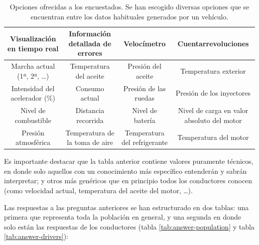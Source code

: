 \begin{table}[H]
  \centering
  \begin{tabularx}{\textwidth}{| C{.25} | C{.25} | C{.25}| C{.25} |}
    \hline
    Visualización en tiempo real   & Información detallada de errores & Velocímetro                  & Cuentarrevoluciones                        \\
    \hline
    Marcha actual (1ª, 2ª, \dots)  & Temperatura del aceite           & Presión del aceite           & Temperatura exterior                       \\
    \hline
    Intensidad del acelerador (\%) & Consumo actual                   & Presión de las ruedas        & Presión de los inyectores                  \\
    \hline
    Nivel de combustible           & Distancia recorrida              & Nivel de batería             & Nivel de carga en valor absoluto del motor \\
    \hline
    Presión atmosférica            & Temperatura de la toma de aire   & Temperatura del refrigerante & Temperatura del motor                      \\
    \hline
  \end{tabularx}
  \caption{Opciones ofrecidas a los encuestados. Se han escogido diversas opciones que se encuentran entre los datos habituales generados por un vehículo.}
  \label{tab:quest-options}
\end{table}

Es importante destacar que la tabla anterior contiene valores puramente técnicos,
en donde solo aquellos con un conocimiento más específico entenderán y sabrán
interpretar; y otros más genéricos que en principio todos los conductores conocen
(como velocidad actual, temperatura del aceite del motor, \dots).

Las respuestas a las preguntas anteriores se han estructurado en dos tablas: una
primera que representa toda la población en general, y una segunda en donde solo
están las respuestas de los conductores (tabla \ref{tab:answer-population} y tabla
\ref{tab:answer-drivers}):

